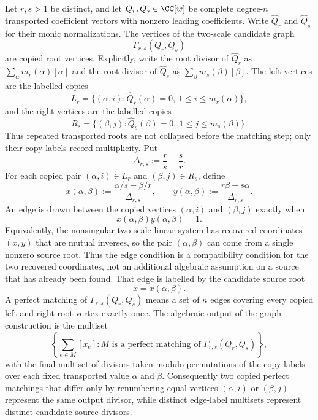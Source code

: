 \begin{definition}\label{def:two-scale-candidate-graph}
Let \(r,s>1\) be distinct, and let \(Q_r,Q_s\in\CC[w]\) be complete
degree-\(n\) transported coefficient vectors with nonzero leading
coefficients.  Write \(\widehat Q_r\) and \(\widehat Q_s\) for their
monic normalizations.  The vertices of the two-scale candidate graph
\[
\Gamma_{r,s}(Q_r,Q_s)
\]
are copied root vertices.  Explicitly, write the root divisor of
\(\widehat Q_r\) as \(\sum_{\alpha}m_r(\alpha)[\alpha]\) and the root
divisor of \(\widehat Q_s\) as
\(\sum_{\beta}m_s(\beta)[\beta]\).  The left vertices are the labelled
copies
\[
L_r=\{(\alpha,i):\widehat Q_r(\alpha)=0,\ 1\le i\le m_r(\alpha)\},
\]
and the right vertices are the labelled copies
\[
R_s=\{(\beta,j):\widehat Q_s(\beta)=0,\ 1\le j\le m_s(\beta)\}.
\]
Thus repeated transported roots are not collapsed before the matching
step; only their copy labels record multiplicity.  Put
\[
\Delta_{r,s}:=\frac r s-\frac s r .
\]
For each copied pair \((\alpha,i)\in L_r\) and
\((\beta,j)\in R_s\), define
\[
x(\alpha,\beta):=
\frac{\alpha/s-\beta/r}{\Delta_{r,s}},
\qquad
y(\alpha,\beta):=
\frac{r\beta-s\alpha}{\Delta_{r,s}}.
\]
An edge is drawn between the copied vertices \((\alpha,i)\) and
\((\beta,j)\) exactly when
\[
x(\alpha,\beta)y(\alpha,\beta)=1.
\]
Equivalently, the nonsingular two-scale linear system has recovered
coordinates \((x,y)\) that are mutual inverses, so the pair
\((\alpha,\beta)\) can come from a single nonzero source root.  Thus
the edge condition is a compatibility condition for the two recovered
coordinates, not an additional algebraic assumption on a source that
has already been found.
That edge is labelled by the candidate source root
\[
x=x(\alpha,\beta).
\]
A perfect matching of \(\Gamma_{r,s}(Q_r,Q_s)\) means a set of \(n\)
edges covering every copied left and right root vertex exactly once.
The algebraic output of the graph construction is the multiset
\[
\left\{\sum_{e\in M}[x_e]:
  M\text{ is a perfect matching of }\Gamma_{r,s}(Q_r,Q_s)\right\},
\]
with the final multiset of divisors taken modulo permutations of the
copy labels over each fixed transported value \(\alpha\) and \(\beta\).
Consequently two copied perfect matchings that differ only by
renumbering equal vertices \((\alpha,i)\) or \((\beta,j)\) represent
the same output divisor, while distinct edge-label multisets represent
distinct candidate source divisors.
\end{definition}

